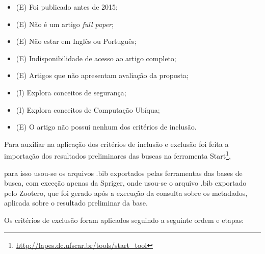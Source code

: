 \documentclass[ti,table]{texufpel} %
\begin{document}
\begin{itemize} 

    \item (E) Foi publicado antes de 2015; 

    \item (E) Não é um artigo \textit{full paper}; 

    \item (E) Não estar em Inglês ou Português; 

    \item (E) Indisponibilidade de acesso ao artigo completo; 

    \item (E) Artigos que não apresentam avaliação da proposta; 

    \item (I) Explora conceitos de segurança; 

    \item (I) Explora conceitos de Computação Ubíqua; 

    \item (E) O artigo não possui nenhum dos critérios de inclusão. 

\end{itemize} 

  

Para auxiliar na aplicação dos critérios de inclusão e exclusão foi feita a importação dos resultados preliminares das buscas na ferramenta Start\footnote{\url{http://lapes.dc.ufscar.br/tools/start_tool}}, 

para isso usou-se os arquivos .bib exportados pelas ferramentas das bases de busca, com exceção apenas da Spriger, onde usou-se o arquivo .bib exportado pelo Zootero, que foi gerado após a execução da consulta sobre os metadados, aplicada sobre o resultado preliminar da base. 

  

Os critérios de exclusão foram aplicados seguindo a seguinte ordem e etapas: 

  

  

  

  
\end{document}
